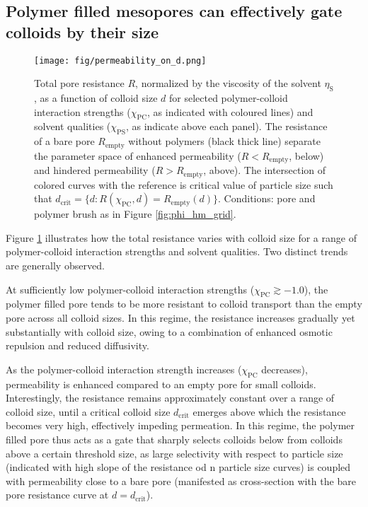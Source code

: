 \documentclass[12pt, a4paper]{article}
\begin{document}
\subsection{Polymer filled mesopores can effectively gate colloids by their size}

\begin{figure}
    \centering
    \texttt{[image: fig/permeability\_on\_d.png]}
    \caption{
    Total pore resistance $R$, normalized by the viscosity of the solvent $\eta_\text{S}$, as a function of colloid size $d$ for selected polymer-colloid interaction strengths ($\chi_{\text{PC}}$, as indicated with coloured lines) and solvent qualities ($\chi_{\text{PS}}$, as indicate above each panel). 
    The resistance of a bare pore $R_{\text{empty}}$ without polymers (black thick line) separate the parameter space of enhanced permeability ($R < R_{\textrm{empty}}$, below) and hindered permeability ($R > R_{\textrm{empty}}$, above).
    The intersection of colored curves with the reference is critical value of particle size such that  $d_{\text{crit}} = \{d: R(\chi_{\text{PC}}, d) = R_{\text{empty}}(d)\}$.
    Conditions: pore and polymer brush as in Figure \ref{fig:phi_hm_grid}. 
    }
    \label{fig:R_vs_d}
\end{figure}

Figure \ref{fig:R_vs_d} illustrates how the total resistance varies with colloid size for a range of polymer-colloid interaction strengths and solvent qualities. 
Two distinct trends are generally observed.

At sufficiently low polymer-colloid interaction strengths ($\chi_{\text{PC}} \gtrsim -1.0$), the polymer filled pore tends to be more resistant to colloid transport than the empty pore across all colloid sizes.
In this regime, the resistance increases gradually yet substantially with colloid size, owing to a combination of enhanced osmotic repulsion and reduced diffusivity.

As the polymer-colloid interaction strength increases ($\chi_{\text{PC}}$ decreases), permeability is enhanced compared to an empty pore for small colloids. 
Interestingly, the resistance remains approximately constant over a range of colloid size, until a critical colloid size $d_{\text{crit}}$ emerges above which the resistance becomes very high, effectively impeding permeation. 
In this regime, the polymer filled pore thus acts as a gate that sharply selects colloids below from colloids above a certain threshold size, as large selectivity with respect to particle size (indicated with high slope of the resistance od n particle size curves) is coupled with permeability close to a bare pore (manifested as cross-section with the bare pore resistance curve at $d = d_{\text{crit}}$).
\end{document}
